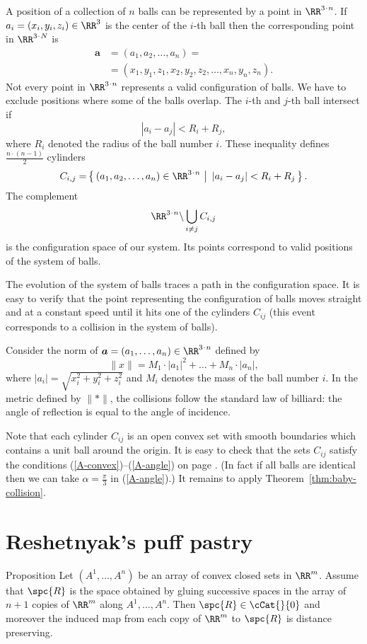 A position of a collection of $n$ balls can be represented by a point in $\RR^{3\cdot n}$.
If $a_i=(x_i,y_i,z_i) \in \RR^3$ is the center of the $i$-th ball
then
the corresponding point in $\RR^{3\cdot N}$ is
\begin{align*}
\bm{a}&=(a_1, a_2 , \dots , a_n ) =
\\
&=(x_1, y_1 , z_1 , x_2 , y_2 , z_2 , \dots , x_n , y_n , z_n).
\end{align*}
Not every point in $\RR^{3\cdot n}$ represents a valid configuration of balls. 
We have to exclude positions where some of the balls overlap. 
The $i$-th and $j$-th ball intersect if 
$$|a_i - a_j | < R_i+R_j,$$
where $R_i$ denoted the radius of the ball number $i$.
These inequality defines $\tfrac{n\cdot(n-1)}{2}$ cylinders 
\[C_{i,j}=\set{(a_1, a_2 , \dots , a_n )\in\RR^{3\cdot n}} {|a_i - a_j | < R_i+R_j}.\] 
The complement
\[\RR^{3\cdot n}\backslash \bigcup_{i\ne j} C_{i,j}\] 
is the configuration space of our system. 
Its points correspond
to valid positions of the system of balls.

The evolution of the system
of balls traces a path in the configuration space. 
It is easy to verify that
the point representing the configuration of balls moves straight and at a
constant speed until it hits one of the cylinders $C_{ij}$ (this event corresponds
to a collision in the system of balls).

Consider the norm of $\bm{a}=(a_1,\dots,a_n)\in \RR^{3\cdot n}$ defined by
\[\lVert x\rVert=M_1\cdot|a_1|^2+\dots+M_n\cdot |a_n|,\]
where $|a_i|=\sqrt{x_i^2+y_i^2+z_i^2}$ 
and $M_i$ denotes the mass of the ball number $i$.
In the metric defined by $\lVert {*}\rVert$,
the collisions follow the
standard law of billiard: 
the angle of reflection is equal to the angle
of incidence. 

Note that each cylinder $C_{ij}$ is an open convex set with smooth boundaries which contains a unit ball around the origin.
It is easy to check that the sets $C_{ij}$ satisfy the conditions (\ref{A-convex})--(\ref{A-angle}) on page \pageref{A-convex}.
(In fact if all balls are identical then we can take $\alpha=\tfrac\pi3$ in (\ref{A-angle}).)
It remains to apply Theorem~\ref{thm:baby-collision}.
\qeds

\section{Reshetnyak's puff pastry}

\begin{thm}{Proposition}
Let $(A^1,\dots,A^n)$ be an array of convex closed sets in $\RR^m$.
Assume that $\spc{R}$ is the space
obtained by
gluing successive spaces in the array of $n+1$ copies of $\RR^m$ 
along $A^1,\dots,A^n$.
Then $\spc{R}\in\cCat{}{0}$
and moreover the induced map from each copy of $\RR^m$ to  $\spc{R}$ is distance preserving.
\end{thm}


